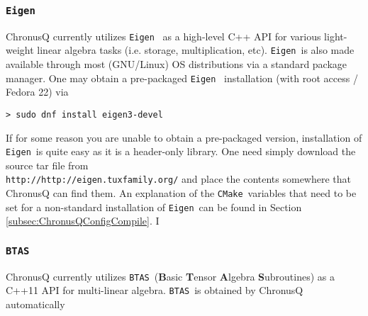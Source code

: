 \documentclass[12pt]{article}
\newcommand{\CMake}{\texttt{CMake}}
\newcommand{\Eigen}{\texttt{Eigen}}
\newcommand{\BTAS}{\texttt{BTAS}}
\begin{document}
      \subsubsection{\Eigen} \label{subsubsec:Eigen}
        ChronusQ currently utilizes \Eigen~\cite{eigen} as a high-level C++ API for
        various light-weight linear algebra tasks (i.e. storage, multiplication,
	etc). \Eigen~is also made available through most (GNU/Linux) OS distributions
	via a standard package manager. One may obtain a pre-packaged \Eigen~
	installation (with root access / Fedora 22) via

	\begin{lstlisting}
> sudo dnf install eigen3-devel
	\end{lstlisting}

        \noindent If for some reason you are unable to obtain a pre-packaged 
	version, installation of \Eigen~is quite easy as it is a header-only 
	library. One need simply download the source tar file from \\
	\texttt{http://http://eigen.tuxfamily.org/} and place the contents 
	somewhere that ChronusQ can find them. An explanation of the 
	\CMake~variables that need to be set for a non-standard installation 
	of \Eigen~can be found
	in Section \ref{subsec:ChronusQConfigCompile}.
I
      \subsubsection{\BTAS} \label{subsubsec:BTAS}
        ChronusQ currently utilizes \BTAS~(\textbf{B}asic \textbf{T}ensor
        \textbf{A}lgebra \textbf{S}ubroutines) \cite{btas} as a C++11 API for multi-linear 
	algebra. \BTAS~is obtained by ChronusQ automatically
\end{document}
